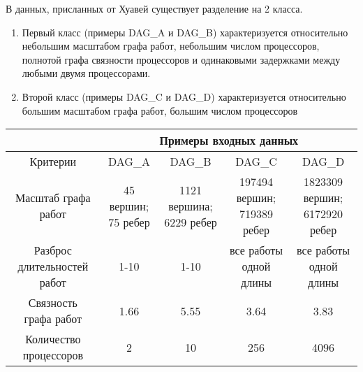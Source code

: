 В данных, присланных от Хуавей существует разделение на 2 класса.
\begin{enumerate}
    \item Первый класс (примеры DAG\_A и DAG\_B) характеризуется относительно небольшим масштабом графа работ, небольшим числом процессоров, полнотой графа связности процессоров и одинаковыми задержками между любыми двумя процессорами.
    \item Второй класс (примеры DAG\_C и DAG\_D) характеризуется относительно большим масштабом графа работ, большим числом процессоров
\end{enumerate}
\begin{table}[!htbp]
    \begin{tabular}{c|c|c|c|c}
                            & \multicolumn{4}{c}{Примеры входных данных}                            \\
        \hline
        Критерии            & DAG\_A                                     & DAG\_B & DAG\_C & DAG\_D \\
        \hline
        Масштаб графа работ & \makecell{45 вершин;                                                  \\75 ребер}                        & \makecell{1121 вершина;\\6229 ребер} & \makecell{197494 вершин;\\719389 ребер} & \makecell{1823309 вершин;\\6172920 ребер} \\
        \hline
        \makecell{Разброс                                                                           \\длительностей работ}            & 1-10                                       & 1-10   & \makecell{все работы\\одной длины} & \makecell{все работы\\одной длины} \\
        \hline
        \makecell{Связность                                                                         \\графа работ}                  & 1.66                                       & 5.55   & 3.64                   & 3.83                   \\
        \hline
        \makecell{Количество                                                                        \\процессоров}                 & 2                                          & 10     & 256                    & 4096                   \\

\end{tabular}
\end{table}
